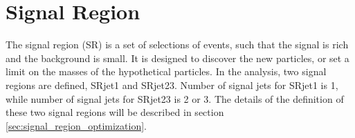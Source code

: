 \chapter{Signal Region}
\label{ch:SR}

The signal region (SR) is a set of selections of events, such that the signal is rich and the background is small.
It is designed to discover the new particles, or set a limit on the masses of the hypothetical particles.
In the analysis, two signal regions are defined, SRjet1 and SRjet23.
Number of signal jets for SRjet1 is 1, while number of signal jets for SRjet23 is 2 or 3.
The details of the definition of these two signal regions will be described in section \ref{sec:signal_region_optimization}.

